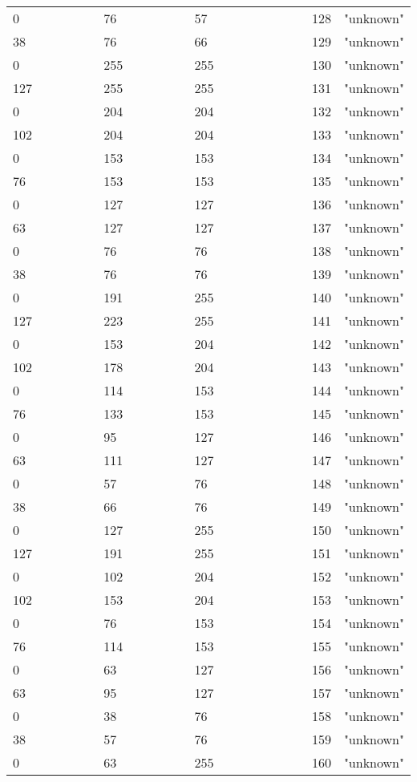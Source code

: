 \begin{longtable}{p{0.3\linewidth} p{0.3\linewidth} p{0.4\linewidth}}
  0 &   76 &   57 &  128 &  "unknown"\\
 38 &   76 &   66 &  129 &  "unknown"\\
  0 &  255 &  255 &  130 &  "unknown"\\
127 &  255 &  255 &  131 &  "unknown"\\
  0 &  204 &  204 &  132 &  "unknown"\\
102 &  204 &  204 &  133 &  "unknown"\\
  0 &  153 &  153 &  134 &  "unknown"\\
 76 &  153 &  153 &  135 &  "unknown"\\
  0 &  127 &  127 &  136 &  "unknown"\\
 63 &  127 &  127 &  137 &  "unknown"\\
  0 &   76 &   76 &  138 &  "unknown"\\
 38 &   76 &   76 &  139 &  "unknown"\\
  0 &  191 &  255 &  140 &  "unknown"\\
127 &  223 &  255 &  141 &  "unknown"\\
  0 &  153 &  204 &  142 &  "unknown"\\
102 &  178 &  204 &  143 &  "unknown"\\
  0 &  114 &  153 &  144 &  "unknown"\\
 76 &  133 &  153 &  145 &  "unknown"\\
  0 &   95 &  127 &  146 &  "unknown"\\
 63 &  111 &  127 &  147 &  "unknown"\\
  0 &   57 &   76 &  148 &  "unknown"\\
 38 &   66 &   76 &  149 &  "unknown"\\
  0 &  127 &  255 &  150 &  "unknown"\\
127 &  191 &  255 &  151 &  "unknown"\\
  0 &  102 &  204 &  152 &  "unknown"\\
102 &  153 &  204 &  153 &  "unknown"\\
  0 &   76 &  153 &  154 &  "unknown"\\
 76 &  114 &  153 &  155 &  "unknown"\\
  0 &   63 &  127 &  156 &  "unknown"\\
 63 &   95 &  127 &  157 &  "unknown"\\
  0 &   38 &   76 &  158 &  "unknown"\\
 38 &   57 &   76 &  159 &  "unknown"\\
  0 &   63 &  255 &  160 &  "unknown"\\

\end{longtable}
